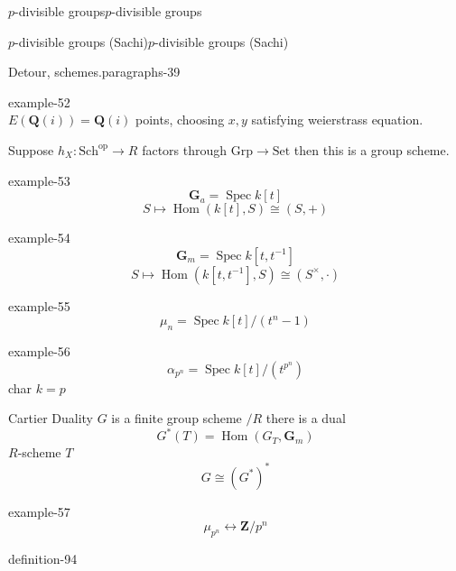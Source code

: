 \documentclass[10pt,]{book}
\numberwithin{equation}{section}
\newcommand{\inv}{^{-1}}
\newcommand{\ZZ}{\mathbf{Z}}
\newcommand{\QQ}{\mathbf{Q}}
\newcommand{\op}{\mathrm{op}}
\DeclareMathOperator{\Hom}{Hom}
\DeclareMathOperator{\Spec}{Spec}
\begin{document}
\begin{chapterptx}{\(p\)-divisible groups}{}{\(p\)-divisible groups}{}{}
\begin{sectionptx}{\(p\)-divisible groups (Sachi)}{}{\(p\)-divisible groups (Sachi)}{}{}
\begin{paragraphs}{Detour, schemes.}{paragraphs-39}
\begin{example}{}{example-52}
\begin{equation*}
\end{equation*}
\(E(\QQ(i)) = \QQ(i)\) points, choosing \(x,y\) satisfying weierstrass equation.%
\end{example}
\hypertarget{p-994}{}%
Suppose \(h_X \colon \mathrm{Sch}^\op \to R\) factors through \(\mathrm{Grp} \to \mathrm{Set}\) then this is a group scheme.%
\begin{example}{}{example-53}%
\hypertarget{p-995}{}%
%
\begin{equation*}
\mathbf G_a = \Spec k[t]
\end{equation*}
%
\begin{equation*}
S\mapsto \Hom(k[t], S) \cong (S,+)
\end{equation*}
%
\end{example}
\begin{example}{}{example-54}%
\hypertarget{p-996}{}%
%
\begin{equation*}
\mathbf G_m = \Spec k[t,t\inv]
\end{equation*}
%
\begin{equation*}
S\mapsto \Hom(k[t,t\inv], S) \cong (S^\times,\cdot)
\end{equation*}
%
\end{example}
\begin{example}{}{example-55}%
\hypertarget{p-997}{}%
%
\begin{equation*}
\mu_n = \Spec k[t]/(t^n -1)
\end{equation*}
%
\end{example}
\begin{example}{}{example-56}%
\hypertarget{p-998}{}%
%
\begin{equation*}
\alpha_{p^n} = \Spec k[t]/(t^{p^n})
\end{equation*}
char \(k = p\)%
\end{example}
\hypertarget{p-999}{}%
Cartier Duality \(G\) is a finite group scheme \(/R\) there is a dual%
\begin{equation*}
G^* (T) = \Hom (G_T, \mathbf G_m)
\end{equation*}
\(R\)-scheme \(T\)%
\begin{equation*}
G \cong (G^*)^*
\end{equation*}
%
\begin{example}{}{example-57}%
\hypertarget{p-1000}{}%
%
\begin{equation*}
\mu_{p^n} \leftrightarrow \ZZ/p^n
\end{equation*}
%
\end{example}
\begin{definition}{}{definition-94}%

\end{definition}
\end{paragraphs}
\end{sectionptx}
\end{chapterptx}
\end{document}
